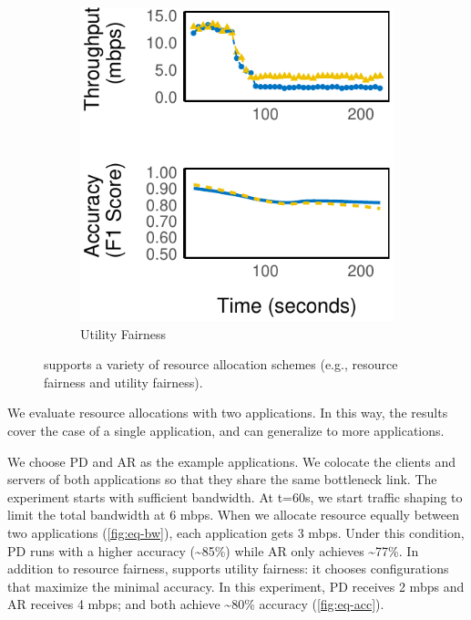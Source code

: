 \begin{figure}
\begin{subfigure}[t]{0.45\columnwidth}
    \includegraphics[width=\textwidth]{figures/multitask-right.pdf}
    \caption{Utility Fairness}
    \label{fig:eq-acc}
  \end{subfigure}
  \caption{\sysname{} supports a variety of resource allocation schemes (e.g., resource fairness and utility fairness).}
  \label{fig:multitask}
\end{figure}

We evaluate resource allocations with two applications. In this way, the results
cover the case of a single application, and can generalize to more applications.

We choose PD and AR as the example applications.
We colocate the clients and servers of both applications so that they
share the same bottleneck link. The experiment starts with sufficient
bandwidth. At t=60s, we start traffic shaping to limit the total bandwidth
at 6 mbps. When we allocate resource equally between two applications
(\autoref{fig:eq-bw}), each application gets 3 mbps. Under this condition,
PD runs with a higher accuracy (\textasciitilde 85\%) while AR only achieves
\textasciitilde 77\%. In addition to resource fairness, \sysname{} supports utility fairness: it
chooses configurations that maximize the minimal accuracy. In this experiment,
PD receives 2 mbps and AR receives 4 mbps; and both achieve \textasciitilde 80\%
accuracy (\autoref{fig:eq-acc}).


